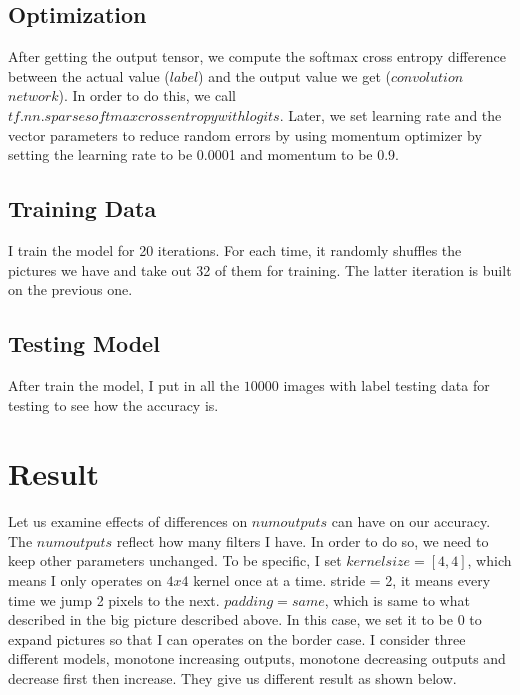 \documentclass[a4paper,10pt]{article}
\begin{document}
\subsection{Optimization}
After getting the output tensor, we compute the softmax cross entropy difference between the actual value ($label$) and the output value we get ($convolution$ $network$). In order to do this, we call $tf.nn.sparsesoftmaxcrossentropywithlogits$\cite{logit}.
Later, we set learning rate and the vector parameters to reduce random errors by using momentum optimizer by setting the learning rate to be 0.0001 and momentum to be 0.9. 
\subsection{Training Data}
I train the model for 20 iterations. For each time, it randomly shuffles the pictures we have and take out 32 of them for training. The latter iteration is built on the previous one.
\subsection{Testing Model}
After train the model, I put in all the $10000$ images with label testing data for testing to see how the accuracy is.
\section{Result}
	Let us examine effects of differences on $numoutputs$ can have on our accuracy. The $numoutputs$ reflect how many filters I have. In order to do so, we need to keep other parameters unchanged. To be specific, I set $kernelsize = [4,4]$, which means I only operates on $4x4$ kernel once at a time. stride = 2, it means every time we jump 2 pixels to the next. $padding= same$, which is same to what described in the big picture described above. In this case, we set it to be $0$ to expand pictures so that I can operates on the border case. I consider three different models, monotone increasing outputs, monotone decreasing outputs and decrease first then increase. They give us different result as shown below.
	
\end{document}

